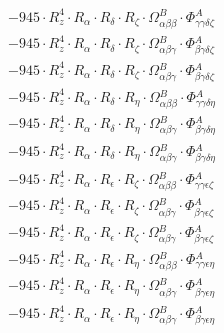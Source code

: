 \documentclass{article}
\begin{document}
\begin{subequations}
\begin{gather}
\begin{array}{c}
 \\[0.2em] 		 - 945 \cdot R_{z}^{4} \cdot R_{\alpha{}} \cdot R_{\delta{}} \cdot R_{\zeta{}} \cdot \Omega{}^{B}_{\alpha{}\beta{}\beta{}} \cdot \Phi{}^{A}_{\gamma{}\gamma{}\delta{}\zeta{}} 
 \\[0.2em] 		 - 945 \cdot R_{z}^{4} \cdot R_{\alpha{}} \cdot R_{\delta{}} \cdot R_{\zeta{}} \cdot \Omega{}^{B}_{\alpha{}\beta{}\gamma{}} \cdot \Phi{}^{A}_{\beta{}\gamma{}\delta{}\zeta{}} 
 \\[0.2em] 		 - 945 \cdot R_{z}^{4} \cdot R_{\alpha{}} \cdot R_{\delta{}} \cdot R_{\zeta{}} \cdot \Omega{}^{B}_{\alpha{}\beta{}\gamma{}} \cdot \Phi{}^{A}_{\beta{}\gamma{}\delta{}\zeta{}} 
 \\[0.2em] 		 - 945 \cdot R_{z}^{4} \cdot R_{\alpha{}} \cdot R_{\delta{}} \cdot R_{\eta{}} \cdot \Omega{}^{B}_{\alpha{}\beta{}\beta{}} \cdot \Phi{}^{A}_{\gamma{}\gamma{}\delta{}\eta{}} 
 \\[0.2em] 		 - 945 \cdot R_{z}^{4} \cdot R_{\alpha{}} \cdot R_{\delta{}} \cdot R_{\eta{}} \cdot \Omega{}^{B}_{\alpha{}\beta{}\gamma{}} \cdot \Phi{}^{A}_{\beta{}\gamma{}\delta{}\eta{}} 
 \\[0.2em] 		 - 945 \cdot R_{z}^{4} \cdot R_{\alpha{}} \cdot R_{\delta{}} \cdot R_{\eta{}} \cdot \Omega{}^{B}_{\alpha{}\beta{}\gamma{}} \cdot \Phi{}^{A}_{\beta{}\gamma{}\delta{}\eta{}} 
 \\[0.2em] 		 - 945 \cdot R_{z}^{4} \cdot R_{\alpha{}} \cdot R_{\epsilon{}} \cdot R_{\zeta{}} \cdot \Omega{}^{B}_{\alpha{}\beta{}\beta{}} \cdot \Phi{}^{A}_{\gamma{}\gamma{}\epsilon{}\zeta{}} 
 \\[0.2em] 		 - 945 \cdot R_{z}^{4} \cdot R_{\alpha{}} \cdot R_{\epsilon{}} \cdot R_{\zeta{}} \cdot \Omega{}^{B}_{\alpha{}\beta{}\gamma{}} \cdot \Phi{}^{A}_{\beta{}\gamma{}\epsilon{}\zeta{}} 
 \\[0.2em] 		 - 945 \cdot R_{z}^{4} \cdot R_{\alpha{}} \cdot R_{\epsilon{}} \cdot R_{\zeta{}} \cdot \Omega{}^{B}_{\alpha{}\beta{}\gamma{}} \cdot \Phi{}^{A}_{\beta{}\gamma{}\epsilon{}\zeta{}} 
 \\[0.2em] 		 - 945 \cdot R_{z}^{4} \cdot R_{\alpha{}} \cdot R_{\epsilon{}} \cdot R_{\eta{}} \cdot \Omega{}^{B}_{\alpha{}\beta{}\beta{}} \cdot \Phi{}^{A}_{\gamma{}\gamma{}\epsilon{}\eta{}} 
 \\[0.2em] 		 - 945 \cdot R_{z}^{4} \cdot R_{\alpha{}} \cdot R_{\epsilon{}} \cdot R_{\eta{}} \cdot \Omega{}^{B}_{\alpha{}\beta{}\gamma{}} \cdot \Phi{}^{A}_{\beta{}\gamma{}\epsilon{}\eta{}} 
 \\[0.2em] 		 - 945 \cdot R_{z}^{4} \cdot R_{\alpha{}} \cdot R_{\epsilon{}} \cdot R_{\eta{}} \cdot \Omega{}^{B}_{\alpha{}\beta{}\gamma{}} \cdot \Phi{}^{A}_{\beta{}\gamma{}\epsilon{}\eta{}} 

\end{array}
\end{gather}
\end{subequations}
\end{document}
